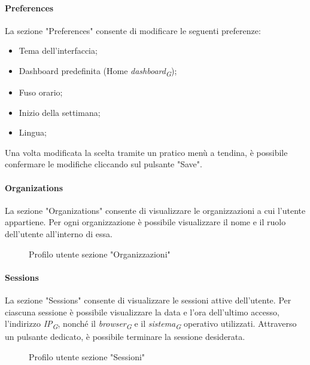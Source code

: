 \paragraph{Preferences}
La sezione "Preferences" consente di modificare le seguenti preferenze:
\begin{itemize}
    \item Tema dell'interfaccia;
    \item Dashboard predefinita (Home \textit{dashboard}\textsubscript{\textit{G}});
    \item Fuso orario;
    \item Inizio della settimana;
    \item Lingua;
\end{itemize}
Una volta modificata la scelta tramite un pratico menù a tendina, è possibile confermare le modifiche cliccando sul pulsante "Save". \\
\paragraph{Organizations}
La sezione "Organizations" consente di visualizzare le organizzazioni a cui l'utente appartiene. Per ogni organizzazione è possibile visualizzare il nome e il ruolo dell'utente all'interno di essa.
\begin{figure}[H]
    \centering
    \caption{Profilo utente sezione "Organizzazioni"}
    \label{fig:my_label}
\end{figure}
\paragraph{Sessions}
La sezione "Sessions" consente di visualizzare le sessioni attive dell'utente. Per ciascuna sessione è possibile visualizzare la data e l'ora dell'ultimo accesso, l'indirizzo \textit{IP}\textsubscript{\textit{G}}, nonché il \textit{browser}\textsubscript{\textit{G}} e il \textit{sistema}\textsubscript{\textit{G}} operativo utilizzati. Attraverso un pulsante dedicato, è possibile terminare la sessione desiderata.
\begin{figure}[H]
    \centering
    \caption{Profilo utente sezione "Sessioni"}
    \label{fig:my_label}
\end{figure}

